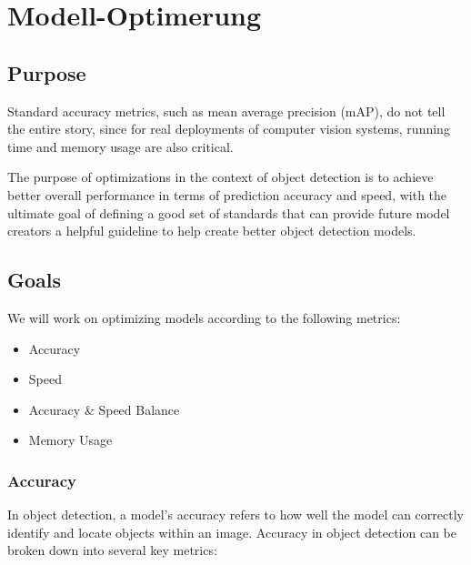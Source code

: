 \chapter{Modell-Optimerung}

\section{Purpose}
Standard accuracy metrics, such as mean average precision (mAP), do not tell the entire story, since for real deployments of computer vision systems, running time and memory usage are also critical. \citep{speedaccuracy2017}

The purpose of optimizations in the context of object detection is to achieve better overall performance in terms of prediction accuracy and speed, with the ultimate goal of defining a good set of standards that can provide future model creators a helpful guideline to help create better object detection models.

\section{Goals}

We will work on optimizing models according to the following metrics:
\begin{itemize}
\item{Accuracy}
\item{Speed}
\item{Accuracy \& Speed Balance}
\item{Memory Usage}
\end{itemize}

\subsection{Accuracy}
In object detection, a model's accuracy refers to how well the model can correctly identify and locate objects within an image. Accuracy in object detection can be broken down into several key metrics:

